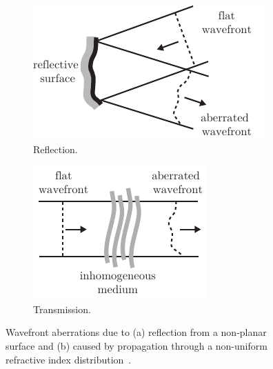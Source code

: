 \begin{figure}[tbh]
       \centering
        \begin{subfigure}[b]{0.4\textwidth}
                \includegraphics[width=\textwidth]{images/wavefront_distortions_reflection}
                \caption{Reflection.}
                \label{fig:abberation_reflection}
        \end{subfigure}
				\hspace{1em}
        \begin{subfigure}[b]{0.3\textwidth}
                \includegraphics[width=\textwidth]{images/wavefront_distortions_transmission}
                \caption{Transmission.}
                \label{fig:abberation_trans}
        \end{subfigure}
        \caption{Wavefront aberrations due to (a) reflection from a non-planar surface and (b)  caused by propagation through a non-uniform 
refractive index distribution~\cite{AOM_basic_ref}.}
\label{fig:abberations}
\end{figure} 

